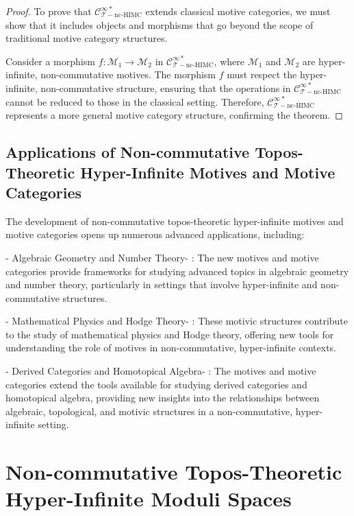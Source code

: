 \documentclass{article}
\begin{document}
\begin{proof}
To prove that \(\mathcal{C}_{\mathcal{T}-\text{nc-HIMC}}^{\infty *}\) extends classical motive categories, we must show that it includes objects and morphisms that go beyond the scope of traditional motive category structures.

Consider a morphism \(f: \mathcal{M}_1 \to \mathcal{M}_2\) in \(\mathcal{C}_{\mathcal{T}-\text{nc-HIMC}}^{\infty *}\), where \(\mathcal{M}_1\) and \(\mathcal{M}_2\) are hyper-infinite, non-commutative motives. The morphism \(f\) must respect the hyper-infinite, non-commutative structure, ensuring that the operations in \(\mathcal{C}_{\mathcal{T}-\text{nc-HIMC}}^{\infty *}\) cannot be reduced to those in the classical setting. Therefore, \(\mathcal{C}_{\mathcal{T}-\text{nc-HIMC}}^{\infty *}\) represents a more general motive category structure, confirming the theorem.
\end{proof}

\subsection{Applications of Non-commutative Topos-Theoretic Hyper-Infinite Motives and Motive Categories}
The development of non-commutative topos-theoretic hyper-infinite motives and motive categories opens up numerous advanced applications, including:

-  Algebraic Geometry and Number Theory- : The new motives and motive categories provide frameworks for studying advanced topics in algebraic geometry and number theory, particularly in settings that involve hyper-infinite and non-commutative structures.

-  Mathematical Physics and Hodge Theory- : These motivic structures contribute to the study of mathematical physics and Hodge theory, offering new tools for understanding the role of motives in non-commutative, hyper-infinite contexts.

-  Derived Categories and Homotopical Algebra- : The motives and motive categories extend the tools available for studying derived categories and homotopical algebra, providing new insights into the relationships between algebraic, topological, and motivic structures in a non-commutative, hyper-infinite setting.


\section{Non-commutative Topos-Theoretic Hyper-Infinite Moduli Spaces}
\end{document}
